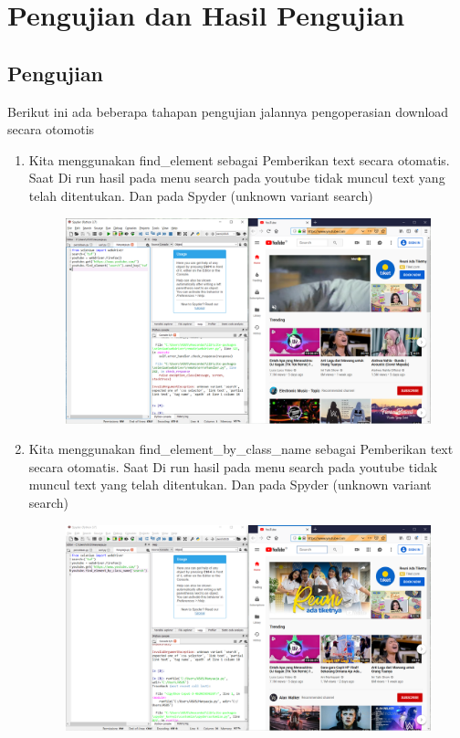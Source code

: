\section{Pengujian dan Hasil Pengujian}
\subsection{Pengujian}
Berikut ini ada beberapa tahapan pengujian jalannya pengoperasian download secara otomotis 

\begin{enumerate}
    \item Kita menggunakan find\_element sebagai Pemberikan text secara otomatis. Saat  Di run hasil pada menu search pada youtube tidak muncul text yang telah ditentukan. Dan pada Spyder {(unknown variant search)}
\begin{figure}[!htbp]
    \centering
    \includegraphics[scale=0.3]{figure/hasilTes/1.png}
    \label{gambar 1}
\end{figure}
\vspace{10cm}
    \item Kita menggunakan find\_element\_by\_class\_name sebagai Pemberikan text secara otomatis. Saat  Di run hasil pada menu search pada youtube tidak muncul text yang telah ditentukan. Dan pada Spyder {(unknown variant search)}
\begin{figure}[!htbp]
    \centering
    \includegraphics[scale=0.3]{figure/hasilTes/2.png}
    \label{gambar 1}
\end{figure}


\end{enumerate}
